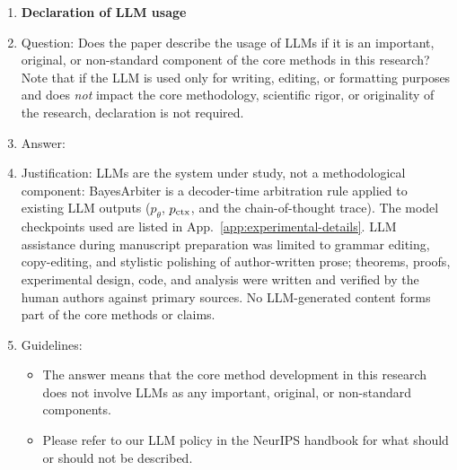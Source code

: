 \begin{enumerate}
\item \textbf{Declaration of LLM usage}
    \item[] Question: Does the paper describe the usage of LLMs if it is an important, original, or non-standard component of the core methods in this research? Note that if the LLM is used only for writing, editing, or formatting purposes and does \emph{not} impact the core methodology, scientific rigor, or originality of the research, declaration is not required.
    \item[] Answer: \answerYes{}
    \item[] Justification: LLMs are the system under study, not a methodological component: BayesArbiter is a decoder-time arbitration rule applied to existing LLM outputs ($p_\theta$, $p_{\mathrm{ctx}}$, and the chain-of-thought trace). The model checkpoints used are listed in App.~\ref{app:experimental-details}. LLM assistance during manuscript preparation was limited to grammar editing, copy-editing, and stylistic polishing of author-written prose; theorems, proofs, experimental design, code, and analysis were written and verified by the human authors against primary sources. No LLM-generated content forms part of the core methods or claims.
    \item[] Guidelines:
    \begin{itemize}
        \item The answer \answerNA{} means that the core method development in this research does not involve LLMs as any important, original, or non-standard components.
        \item Please refer to our LLM policy in the NeurIPS handbook for what should or should not be described.
    \end{itemize}

\end{enumerate}
